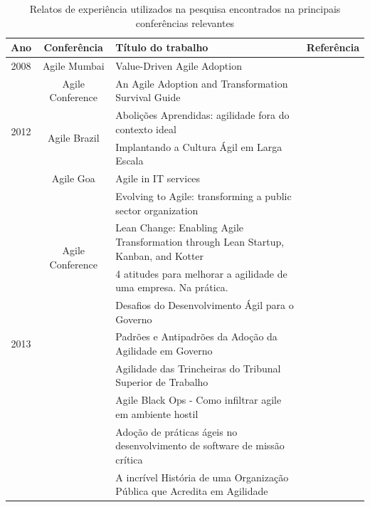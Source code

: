\begin{table}[h]
	\centering
	\captionsetup{justification=centering,margin=1cm}
	\begin{tabular}{| c | c | m{8cm} | m{2.5cm} |} \hline \textbf{Ano} & \textbf{Conferência}  & \textbf{Título do trabalho} & \textbf{Referência} \\ \hline
		\multirow{1}{*}{2008}
			& Agile Mumbai & Value-Driven Agile Adoption & \cite{Ahmed2008} \\ \cline{2-4}
		\hline \hline
		\multirow{4}{*}{2012}
			& \multirow{1}{*}{Agile Conference}
				& An Agile Adoption and Transformation Survival Guide & \cite{Sahota2012} \\ \cline{2-4}
			& \multirow{2}{*}{Agile Brazil}
				& Abolições Aprendidas: agilidade fora do contexto ideal & \cite{Piegas2012} \\ \cline{3-4}
				&& Implantando a Cultura Ágil em Larga Escala & \cite{Parzinello2012} \\ \cline{2-4}
			& \multirow{1}{*}{Agile Goa}
				& Agile in IT services & \cite{Srinath2012} \\ \cline{2-4}
		\hline \hline
		\multirow{18}{*}{2013}
			& \multirow{4}{*}{Agile Conference}
				& Evolving to Agile: transforming a public sector organization & \cite{Karaj2013} \\ \cline{3-4}
				&& Lean Change: Enabling Agile Transformation through Lean Startup, Kanban, and Kotter & \cite{Hui2013} \\ \cline{2-4}
			& \multirow{12}{*}{Agile Brazil}
				& 4 atitudes para melhorar a agilidade de uma empresa. Na prática. & \cite{Valerio2013} \\ \cline{3-4}
				&& Desafios do Desenvolvimento Ágil para o Governo & \cite{Stefano2013} \\ \cline{3-4}
				&& Padrões e Antipadrões da Adoção da Agilidade em Governo & \cite{Rodrigues2013} \\ \cline{3-4}
				&& Agilidade das Trincheiras do Tribunal Superior de Trabalho & \cite{Vieira2013} \\ \cline{3-4}
				&& Agile Black Ops - Como infiltrar agile em ambiente hostil & \cite{Queiroz2013} \\ \cline{3-4}
				&& Adoção de práticas ágeis no desenvolvimento de software de missão crítica & \cite{Bastos2013} \\ \cline{3-4}
				&& A incrível História de uma Organização Pública que Acredita em Agilidade & \cite{Maciel2013} \\ \cline{2-4}
		\hline
	\end{tabular}
	\caption{Relatos de experiência utilizados na pesquisa encontrados na principais conferências relevantes}
	\label{tab:relatosEncontrados}
\end{table}
